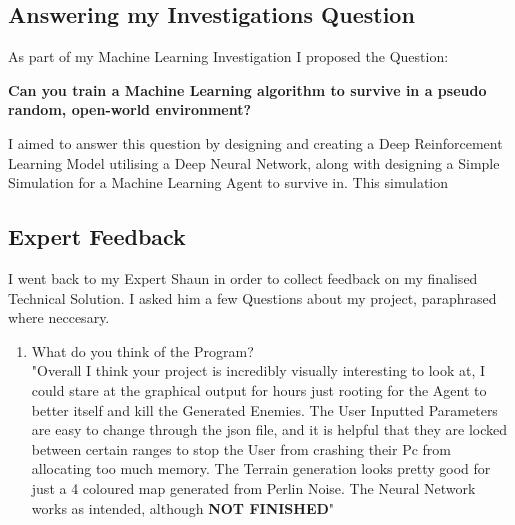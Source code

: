 \begin{flushleft}
            \vspace{0.5cm}   

        \vspace{0.5cm}
    \subsection{Answering my Investigations Question}
        \vspace{0.2cm}
        As part of my Machine Learning Investigation I proposed the Question:

        \vspace{0.3cm}\begin{center}
        \textbf{Can you train a Machine Learning algorithm to survive in a pseudo random, open-world environment?}
        \end{center}\vspace{0.3cm}

        I aimed to answer this question by designing and creating a Deep Reinforcement Learning Model utilising a Deep Neural Network, along 
        with designing a Simple Simulation for a Machine Learning Agent to survive in. This simulation

        \vspace{0.5cm}

    \subsection{Expert Feedback}
        \vspace{0.2cm}
        I went back to my Expert Shaun in order to collect feedback on my finalised Technical Solution. I asked him a few Questions about my
        project, paraphrased where neccesary. \\
        \vspace{0.5cm}

        \begin{enumerate}
            \item What do you think of the Program? \\
                \vspace{0.2cm}
                "Overall I think your project is incredibly visually interesting to look at, I could stare at the graphical output for hours
                just rooting for the Agent to better itself and kill the Generated Enemies. The User Inputted Parameters are easy to change
                through the json file, and it is helpful that they are locked between certain ranges to stop the User from crashing their Pc
                from allocating too much memory. The Terrain generation looks pretty good for just a 4 coloured map generated from Perlin Noise.
                The Neural Network works as intended, although \textbf{NOT FINISHED}"


\end{enumerate}
\end{flushleft}
